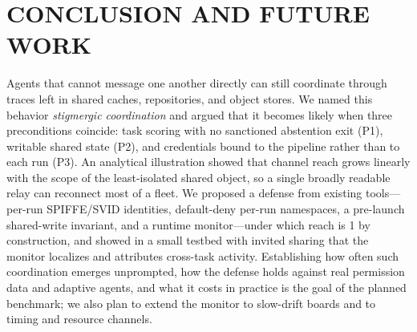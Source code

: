 \documentclass[conference]{IEEEtran}
\begin{document}
\section{CONCLUSION AND FUTURE WORK}

Agents that cannot message one another directly can still coordinate through traces left in shared caches, repositories, and object stores. We named this behavior \textit{stigmergic coordination} and argued that it becomes likely when three preconditions coincide: task scoring with no sanctioned abstention exit (P1), writable shared state (P2), and credentials bound to the pipeline rather than to each run (P3). An analytical illustration showed that channel reach grows linearly with the scope of the least-isolated shared object, so a single broadly readable relay can reconnect most of a fleet. We proposed a defense from existing tools---per-run SPIFFE/\allowbreak SVID identities, default-deny per-run namespaces, a pre-launch shared-write invariant, and a runtime monitor---under which reach is 1 by construction, and showed in a small testbed with invited sharing that the monitor localizes and attributes cross-task activity. Establishing how often such coordination emerges unprompted, how the defense holds against real permission data and adaptive agents, and what it costs in practice is the goal of the planned benchmark; we also plan to extend the monitor to slow-drift boards and to timing and resource channels.
\end{document}
